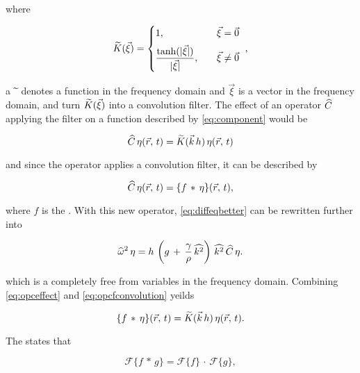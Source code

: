 where

\begin{equation} \label{eq:transkernelofxivec}
\widetilde{K}(\vec{\xi}) = \begin{cases}
1                                                  , & \quad \vec{\xi} = \vec{0} \\[.5em]
\displaystyle\frac{\tanh(|\vec{\xi}|)}{|\vec{\xi}|}, & \quad \vec{\xi} \neq \vec{0}
\end{cases}\ ,
\end{equation}

a $\widetilde{~}$ denotes a function in the frequency domain and $\vec{\xi}$ is a  vector in the frequency domain, and turn $\widetilde{K}(\vec{\xi})$ into a convolution filter. The effect of an operator $\widehat{C}$ applying the filter on a function described by \eqref{eq:component} would be

\begin{equation} \label{eq:opceffect}
\widehat{C}\,\eta(\vec{r},\,t) = \widetilde{K}(\vec{k}\,h)\,\eta(\vec{r},\,t)
\end{equation}

and since the operator applies a convolution filter, it can be described by

\begin{equation} \label{eq:opcfconvolution}
\widehat{C}\,\eta(\vec{r},\,t) = \{f\,*\,\eta\}(\vec{r},\,t),
\end{equation}

where $f$ is the . With this new operator, \eqref{eq:diffeqbetter} can be rewritten further into

\begin{equation} \label{eq:diffeqspatial}
\widehat{\omega}^2\,\eta = h\,\left(g\,+\,\frac{\gamma}{\rho}\,\widehat{k^2}\right)\,\widehat{k^2}\,\widehat{C}\,\eta.
\end{equation}

which is a \PDE completely free from variables in the frequency domain. Combining \eqref{eq:opceffect} and \eqref{eq:opcfconvolution} yeilds

\begin{equation} \label{eq:fconvolutioneffect}
\{f\,*\,\eta\}(\vec{r},\,t) = \widetilde{K}(\vec{k}\,h)\,\eta(\vec{r},\,t).
\end{equation}

The  states that

\begin{equation} \label{eq:convolutiontheorem}
\mathcal{F}\{f\,*\,g\} = \mathcal{F}\{f\}\,\cdot\,\mathcal{F}\{g\},
\end{equation}

